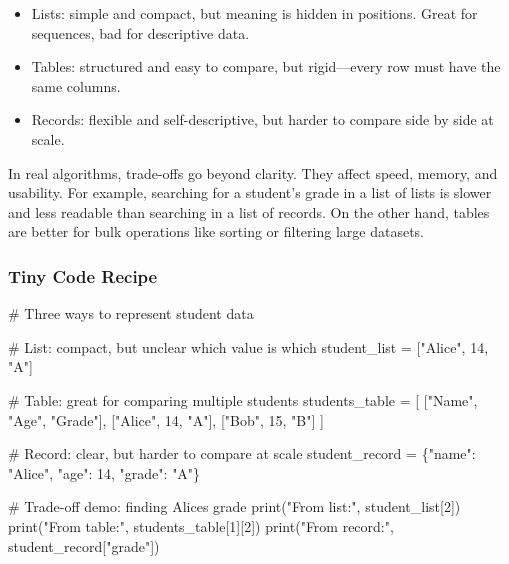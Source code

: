 \documentclass[
  letterpaper,
  DIV=11,
  numbers=noendperiod]{scrreprt}
\newenvironment{Shaded}{\begin{snugshade}}{\end{snugshade}}
\newcommand{\BuiltInTok}[1]{\textcolor[rgb]{0.00,0.23,0.31}{#1}}
\newcommand{\CommentTok}[1]{\textcolor[rgb]{0.37,0.37,0.37}{#1}}
\newcommand{\DecValTok}[1]{\textcolor[rgb]{0.68,0.00,0.00}{#1}}
\newcommand{\NormalTok}[1]{\textcolor[rgb]{0.00,0.23,0.31}{#1}}
\newcommand{\OperatorTok}[1]{\textcolor[rgb]{0.37,0.37,0.37}{#1}}
\newcommand{\StringTok}[1]{\textcolor[rgb]{0.13,0.47,0.30}{#1}}
\providecommand{\tightlist}{%
  \setlength{\itemsep}{0pt}\setlength{\parskip}{0pt}}
\begin{document}
\begin{itemize}
\tightlist
\item
  Lists: simple and compact, but meaning is hidden in positions. Great
  for sequences, bad for descriptive data.
\item
  Tables: structured and easy to compare, but rigid---every row must
  have the same columns.
\item
  Records: flexible and self-descriptive, but harder to compare side by
  side at scale.
\end{itemize}

In real algorithms, trade-offs go beyond clarity. They affect speed,
memory, and usability. For example, searching for a student's grade in a
list of lists is slower and less readable than searching in a list of
records. On the other hand, tables are better for bulk operations like
sorting or filtering large datasets.

\subsubsection{Tiny Code Recipe}\label{tiny-code-recipe-54}

\begin{Shaded}
\begin{Highlighting}[]
\CommentTok{\# Three ways to represent student data}

\CommentTok{\# List: compact, but unclear which value is which}
\NormalTok{student\_list }\OperatorTok{=}\NormalTok{ [}\StringTok{"Alice"}\NormalTok{, }\DecValTok{14}\NormalTok{, }\StringTok{"A"}\NormalTok{]}

\CommentTok{\# Table: great for comparing multiple students}
\NormalTok{students\_table }\OperatorTok{=}\NormalTok{ [}
\NormalTok{    [}\StringTok{"Name"}\NormalTok{, }\StringTok{"Age"}\NormalTok{, }\StringTok{"Grade"}\NormalTok{],}
\NormalTok{    [}\StringTok{"Alice"}\NormalTok{, }\DecValTok{14}\NormalTok{, }\StringTok{"A"}\NormalTok{],}
\NormalTok{    [}\StringTok{"Bob"}\NormalTok{, }\DecValTok{15}\NormalTok{, }\StringTok{"B"}\NormalTok{]}
\NormalTok{]}

\CommentTok{\# Record: clear, but harder to compare at scale}
\NormalTok{student\_record }\OperatorTok{=}\NormalTok{ \{}\StringTok{"name"}\NormalTok{: }\StringTok{"Alice"}\NormalTok{, }\StringTok{"age"}\NormalTok{: }\DecValTok{14}\NormalTok{, }\StringTok{"grade"}\NormalTok{: }\StringTok{"A"}\NormalTok{\}}

\CommentTok{\# Trade{-}off demo: finding Alice\textquotesingle{}s grade}
\BuiltInTok{print}\NormalTok{(}\StringTok{"From list:"}\NormalTok{, student\_list[}\DecValTok{2}\NormalTok{])}
\BuiltInTok{print}\NormalTok{(}\StringTok{"From table:"}\NormalTok{, students\_table[}\DecValTok{1}\NormalTok{][}\DecValTok{2}\NormalTok{])}
\BuiltInTok{print}\NormalTok{(}\StringTok{"From record:"}\NormalTok{, student\_record[}\StringTok{"grade"}\NormalTok{])}
\end{Highlighting}
\end{Shaded}
\end{document}
